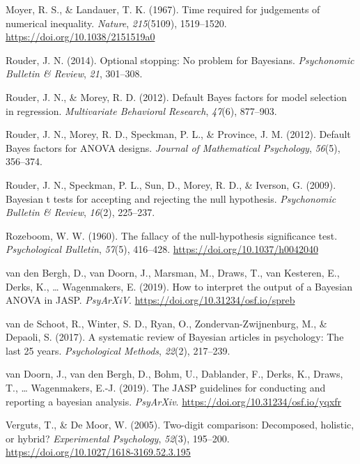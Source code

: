 \documentclass[english,,doc,floatsintext]{apa6}
\begin{document}
\leavevmode\hypertarget{ref-moyer1967}{}%
Moyer, R. S., \& Landauer, T. K. (1967). Time required for judgements of numerical inequality. \emph{Nature}, \emph{215}(5109), 1519--1520. \url{https://doi.org/10.1038/2151519a0}

\leavevmode\hypertarget{ref-rouder2014optional}{}%
Rouder, J. N. (2014). Optional stopping: No problem for Bayesians. \emph{Psychonomic Bulletin \& Review}, \emph{21}, 301--308.

\leavevmode\hypertarget{ref-rouder2012defaultRegression}{}%
Rouder, J. N., \& Morey, R. D. (2012). Default Bayes factors for model selection in regression. \emph{Multivariate Behavioral Research}, \emph{47}(6), 877--903.

\leavevmode\hypertarget{ref-rouder2012defaultAnova}{}%
Rouder, J. N., Morey, R. D., Speckman, P. L., \& Province, J. M. (2012). Default Bayes factors for ANOVA designs. \emph{Journal of Mathematical Psychology}, \emph{56}(5), 356--374.

\leavevmode\hypertarget{ref-rouder2009bayesian}{}%
Rouder, J. N., Speckman, P. L., Sun, D., Morey, R. D., \& Iverson, G. (2009). Bayesian t tests for accepting and rejecting the null hypothesis. \emph{Psychonomic Bulletin \& Review}, \emph{16}(2), 225--237.

\leavevmode\hypertarget{ref-rozeboom1960}{}%
Rozeboom, W. W. (1960). The fallacy of the null-hypothesis significance test. \emph{Psychological Bulletin}, \emph{57}(5), 416--428. \url{https://doi.org/10.1037/h0042040}

\leavevmode\hypertarget{ref-vandenbergh2019how}{}%
van den Bergh, D., van Doorn, J., Marsman, M., Draws, T., van Kesteren, E., Derks, K., \ldots{} Wagenmakers, E. (2019). How to interpret the output of a Bayesian ANOVA in JASP. \emph{PsyArXiV}. \url{https://doi.org/10.31234/osf.io/spreb}

\leavevmode\hypertarget{ref-vandeschoot2017systematic}{}%
van de Schoot, R., Winter, S. D., Ryan, O., Zondervan-Zwijnenburg, M., \& Depaoli, S. (2017). A systematic review of Bayesian articles in psychology: The last 25 years. \emph{Psychological Methods}, \emph{22}(2), 217--239.

\leavevmode\hypertarget{ref-doorn2019jaspguidelines}{}%
van Doorn, J., van den Bergh, D., Bohm, U., Dablander, F., Derks, K., Draws, T., \ldots{} Wagenmakers, E.-J. (2019). The JASP guidelines for conducting and reporting a bayesian analysis. \emph{PsyArXiv}. \url{https://doi.org/10.31234/osf.io/yqxfr}

\leavevmode\hypertarget{ref-vergutsDeMoor2005}{}%
Verguts, T., \& De Moor, W. (2005). Two-digit comparison: Decomposed, holistic, or hybrid? \emph{Experimental Psychology}, \emph{52}(3), 195--200. \url{https://doi.org/10.1027/1618-3169.52.3.195}
\end{document}
